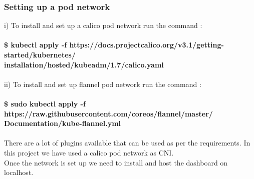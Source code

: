 \documentclass[12pt]{article}
\begin{document}
\subsubsection{Setting up a pod network}
	i) To install and set up a calico pod network run the command :\\\\
	\textbf{\$ kubectl apply -f https://docs.projectcalico.org/v3.1/getting-started/kubernetes/\\installation/hosted/kubeadm/1.7/calico.yaml}\\\\
	ii) To install and set up flannel pod network run the command :\\\\
	\textbf{\$ sudo kubectl apply -f https://raw.githubusercontent.com/coreos/flannel/master/\\Documentation/kube-flannel.yml}\\\\
	There are a lot of plugins available that can be used as per the requirements. In this project we have used a calico pod network as CNI.\\
	Once the network is set up we need to install and host the dashboard on localhost.
\end{document}
